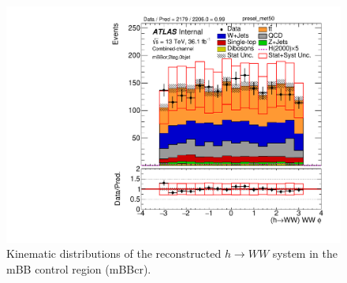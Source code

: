 \begin{figure}[!h]
\begin{center}
\includegraphics[scale=0.33]{./figures/boosted/PlotsInMbbCR/DataMC_2tag_0bjet_mbbcr_lepton_presel_met50_WWPhi}
\caption{Kinematic distributions of the reconstructed $h \to WW$ system in the mBB control region (mBBcr).}
\label{fig:boosted_mbbcr_wwsystem}
\end{center}
\end{figure}
 \newpage
